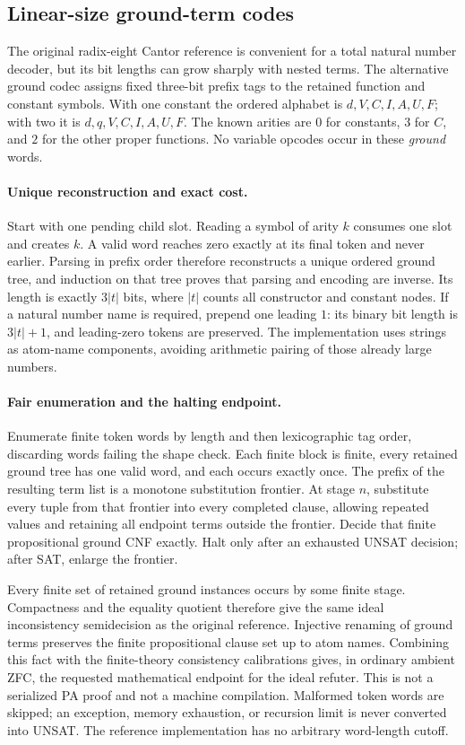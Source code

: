 \subsection{Linear-size ground-term codes}

The original radix-eight Cantor reference is convenient for a total natural
number decoder, but its bit lengths can grow sharply with nested terms.
The alternative ground codec assigns fixed three-bit prefix tags to the
retained function and constant symbols.  With one constant the ordered
alphabet is $d,V,C,I,A,U,F$; with two it is $d,q,V,C,I,A,U,F$.
The known arities are $0$ for constants, $3$ for $C$, and $2$ for the other
proper functions.  No variable opcodes occur in these \emph{ground} words.

\paragraph{Unique reconstruction and exact cost.}
Start with one pending child slot.  Reading a symbol of arity $k$ consumes one
slot and creates $k$.  A valid word reaches zero exactly at its final token
and never earlier.  Parsing in prefix order therefore reconstructs a unique
ordered ground tree, and induction on that tree proves that parsing and
encoding are inverse.  Its length is exactly $3\lvert t\rvert$ bits, where
$\lvert t\rvert$ counts all constructor and constant nodes.  If a natural
number name is required, prepend one leading $1$: its binary bit length is
$3\lvert t\rvert+1$, and leading-zero tokens are preserved.  The implementation
uses strings as atom-name components, avoiding arithmetic pairing of those
already large numbers.

\paragraph{Fair enumeration and the halting endpoint.}
Enumerate finite token words by length and then lexicographic tag order,
discarding words failing the shape check.  Each finite block is finite, every
retained ground tree has one valid word, and each occurs exactly once.  The
prefix of the resulting term list is a monotone substitution frontier.
At stage $n$, substitute every tuple from that frontier into every completed
clause, allowing repeated values and retaining all endpoint terms outside the
frontier.  Decide that finite propositional ground CNF exactly.  Halt only
after an exhausted UNSAT decision; after SAT, enlarge the frontier.

Every finite set of retained ground instances occurs by some finite stage.
Compactness and the equality quotient therefore give the same ideal
inconsistency semidecision as the original reference.  Injective renaming of
ground terms preserves the finite propositional clause set up to atom names.
Combining this fact with the finite-theory consistency calibrations gives, in
ordinary ambient ZFC, the requested mathematical endpoint for the ideal
refuter.  This is not a serialized PA proof and not a machine compilation.
Malformed token words are skipped; an exception, memory exhaustion, or
recursion limit is never converted into UNSAT.  The reference implementation
has no arbitrary word-length cutoff.

